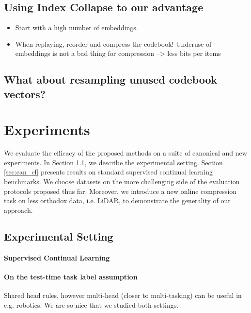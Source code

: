 \documentclass[colorinlistoftodos]{article} %
\begin{document}
\subsection{Using Index Collapse to our advantage}
\begin{itemize}
    \item Start with a high number of embeddings. 
    \item When replaying, reorder and compress the codebook! Underuse of embeddings is not a bad thing for compression --> less bits per items
\end{itemize}

\subsection{What about resampling unused codebook vectors?}

\section{Experiments}

We evaluate the efficacy of the proposed methods on a suite of canonical and new experiments. In Section \ref{sec:exp_details}, we describe the experimental setting. Section \ref{sec:can_cl} presents results on standard supervised continual learning benchmarks. We choose datasets on the more challenging side of the evaluation protocols proposed thus far. Moreover, we introduce a new online compression task on less orthodox data, i.e. LiDAR, to demonstrate the generality of our approach.

\subsection{Experimental Setting}
\label{sec:exp_details}


\paragraph{Supervised Continual Learning}


\paragraph{On the test-time task label assumption} Shared head rules, however multi-head (closer to multi-tasking) can be useful in e.g. robotics. We are so nice that we studied both settings.
\end{document}
